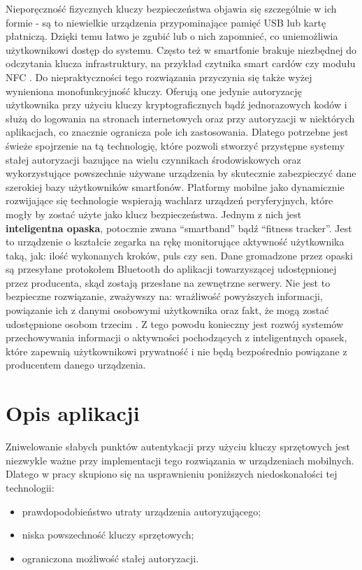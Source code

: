 \indent Nieporęczność fizycznych kluczy bezpieczeństwa objawia się szczególnie w ich formie - są to niewielkie urządzenia przypominające pamięć USB
lub kartę płatniczą. Dzięki temu łatwo je zgubić lub o nich zapomnieć, co uniemożliwia użytkownikowi dostęp do systemu. Często też w smartfonie
brakuje niezbędnej do odczytania klucza infrastruktury, na przykład czytnika smart cardów czy modułu NFC \cite{Usability-Two-Factor}.
Do niepraktyczności tego rozwiązania przyczynia się także wyżej wynieniona monofunkcyjność kluczy. Oferują one jedynie autoryzację użytkownika przy
użyciu kluczy kryptograficznych bądź jednorazowych kodów i służą do logowania na stronach internetowych oraz przy autoryzacji w niektórych aplikacjach,
co znacznie ogranicza pole ich zastosowania. Dlatego potrzebne jest świeże spojrzenie na tą technologię, które pozwoli stworzyć
przystępne systemy stałej autoryzacji bazujące na wielu czynnikach środowiskowych oraz wykorzystujące powszechnie używane urządzenia
by skutecznie zabezpieczyć dane szerokiej bazy użytkowników smartfonów.
\newline\newline
\indent Platformy mobilne jako dynamicznie rozwijające się technologie wspierają wachlarz urządzeń peryferyjnych, które mogły by zostać użyte jako klucz
bezpieczeństwa. Jednym z nich jest \textbf{inteligentna opaska}, potocznie zwana ``smartband'' bądź ``fitness tracker''. Jest to urządzenie o
kształcie zegarka na rękę monitorujące aktywność użytkownika taką, jak: ilość wykonanych kroków, puls czy sen. Dane gromadzone przez opaski są
przesyłane protokołem Bluetooth do aplikacji towarzyszącej udostępnionej przez producenta, skąd zostają przesłane na zewnętrzne serwery. Nie
jest to bezpieczne rozwiązanie, zważywszy na: wrażliwość powyższych informacji, powiązanie ich z danymi osobowymi użytkownika oraz fakt,
że mogą zostać udostępnione osobom trzecim \cite{Fitness-Tracker-Security}. Z tego powodu konieczny jest rozwój systemów przechowywania informacji o aktywności pochodzących z
inteligentnych opasek, które zapewnią użytkownikowi prywatność i nie będą bezpośrednio powiązane z producentem danego urządzenia.

\section{Opis aplikacji}
Zniwelowanie słabych punktów autentykacji przy użyciu kluczy sprzętowych jest niezwykle ważne przy implementacji tego rozwiązania w urządzeniach
mobilnych. Dlatego w pracy skupiono się na usprawnieniu poniższych niedoskonałości tej technologii:
\begin{itemize}
    \item prawdopodobieństwo utraty urządzenia autoryzującego;
    \item niska powszechność kluczy sprzętowych;
    \item ograniczona możliwość stałej autoryzacji.
\end{itemize}

